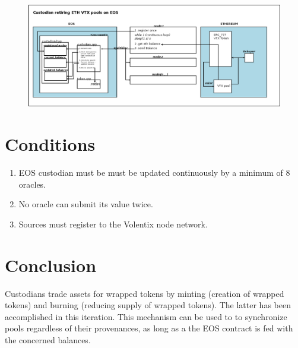 \documentclass[]{article}
\begin{document}
 
 
\begin{figure}
\centering
	\includegraphics[scale=.33333]{bridge.png}
\caption{}
\label{fig:whitebackground-ecosystem02}
\end{figure}

\section{Conditions}
\begin{enumerate}
	\item EOS custodian must be  must be updated continuously by a minimum of 8 oracles.
	\item No oracle can submit its value twice. 
	\item Sources must register to the Volentix node network.
	
\end{enumerate}



\section{Conclusion}
Custodians trade assets for wrapped tokens by minting (creation of wrapped tokens) and burning (reducing supply of wrapped tokens). The latter has been accomplished in this iteration.
This mechanism can be used to to synchronize pools regardless of their provenances, as long as a the EOS contract is fed with the concerned balances.
\end{document}
